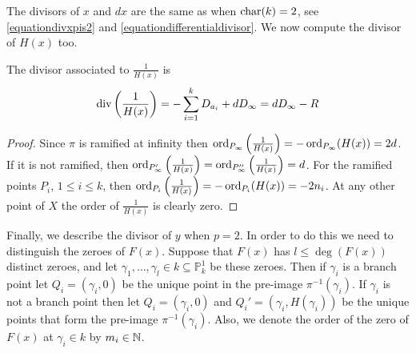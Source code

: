 The divisors of $x$ and $dx$ are the same as when $\operatorname{char}(k) = 2$, see \eqref{equationdivxpis2} and \eqref{equationdifferentialdivisor}.
We now compute the divisor of $H(x)$ too.



    \begin{lem}\label{h(x)char2}
    The divisor associated to $\frac{1}{H(x)}$ is
        \[
        \operatorname{div} \left(\frac{1}{H(x)}\right) = - \sum_{i=1}^k D_{a_i} + dD_\infty = dD_\infty - R
        \]
    \end{lem}
    \begin{proof}
    Since $\pi$ is ramified at infinity then $\operatorname{ord}_{P_{\infty}}\left(\frac{1}{H(x)}\right) = -\operatorname{ord}_{P_{\infty}}(H(x)) = 2d$.
    If it is not ramified, then $\operatorname{ord}_{P_{\infty}'}\left(\frac{1}{H(x)}\right) = \operatorname{ord}_{P_{\infty}''}\left(\frac{1}{H(x)}\right)=d$.
    For the ramified points $P_i$, $1\leq i \leq k$, then $\operatorname{ord}_{P_i}\left(\frac{1}{H(x)}\right) = -\operatorname{ord}_{P_i}(H(x))= -2n_i$.
    At any other point of $X$ the order of $\frac{1}{H(x)}$ is clearly zero.
    \end{proof}
    
Finally, we describe the divisor of $y$ when $p=2$.
In order to do this we need to distinguish the zeroes of $F(x)$.
Suppose that $F(x)$ has $l \leq \deg(F(x))$ distinct zeroes, and let $\gamma_1, \ldots, \gamma_l \in k \subseteq \mathbb P_k^1$ be these zeroes.
Then if $\gamma_i$ is a branch point let $Q_i = (\gamma_i, 0)$ be the unique point in the pre-image $\pi^{-1}(\gamma_i)$.
If $\gamma_i$ is not a branch point then let $Q_i = (\gamma_i, 0)$ and $Q_i' = (\gamma_i, H(\gamma_i))$ be the unique points that form the pre-image $\pi^{-1}(\gamma_i)$.
Also, we denote the order of the zero of $F(x)$ at $\gamma_i \in k$ by $m_i \in {\mathbb N}$.


